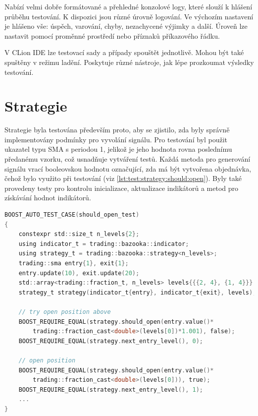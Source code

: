 Nabízí velmi dobře formátované a přehledné konzolové logy, které slouží k hlášení průběhu testování.
K dispozici jsou různé úrovně logování.
Ve výchozím nastavení je hlášeno vše: úspěch, varování, chyby, nezachycené výjimky a další.
Úroveň lze nastavit pomocí proměnné prostředí nebo příznaků příkazového řádku.

V CLion IDE lze testovací sady a případy spouštět jednotlivě.
Mohou být také spuštěny v režimu ladění.
Poskytuje různé nástroje, jak lépe prozkoumat výsledky testování.

\section{Strategie}
Strategie byla testována především proto, aby se zjistilo, zda byly správně implementovány podmínky pro vyvolání signálu.
Pro testování byl použit ukazatel typu SMA s periodou 1, jelikož je jeho hodnota rovna poslednímu předanému vzorku, což usnadňuje vytváření testů.
Každá metoda pro generování signálu vrací booleovskou hodnotu označující, zda má být vytvořena objednávka, čehož bylo využito při testování (viz \ref{lst:test:strategy:should:open}).
Byly také provedeny testy pro kontrolu inicializace, aktualizace indikátorů a metod pro získávání hodnot indikátorů.

\begin{lstlisting}[caption={~Testování podmínek pro signalizaci vytvoření otevírací objednávky},label={lst:test:strategy:should:open},captionpos=t,abovecaptionskip=-\medskipamount,belowcaptionskip=\medskipamount,language=C]
BOOST_AUTO_TEST_CASE(should_open_test)
{
    constexpr std::size_t n_levels{2};
    using indicator_t = trading::bazooka::indicator;
    using strategy_t = trading::bazooka::strategy<n_levels>;
    trading::sma entry{1}, exit{1};
    entry.update(10), exit.update(20);
    std::array<trading::fraction_t, n_levels> levels{{{2, 4}, {1, 4}}};
    strategy_t strategy(indicator_t{entry}, indicator_t{exit}, levels);

    // try open position above
    BOOST_REQUIRE_EQUAL(strategy.should_open(entry.value()*
        trading::fraction_cast<double>(levels[0])*1.001), false);
    BOOST_REQUIRE_EQUAL(strategy.next_entry_level(), 0);

    // open position
    BOOST_REQUIRE_EQUAL(strategy.should_open(entry.value()*
        trading::fraction_cast<double>(levels[0])), true);
    BOOST_REQUIRE_EQUAL(strategy.next_entry_level(), 1);
    ...
}
\end{lstlisting}

